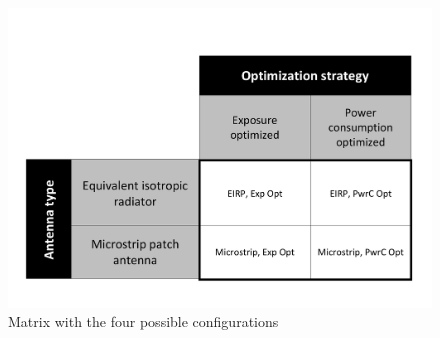 \begin{figure}[h!]
  \includegraphics[width=\textwidth]{../images/fourCasesMatrix.pdf}
  \caption{Matrix with the four possible configurations}
  \label{fig:fourCasesMatrix}
\end{figure}